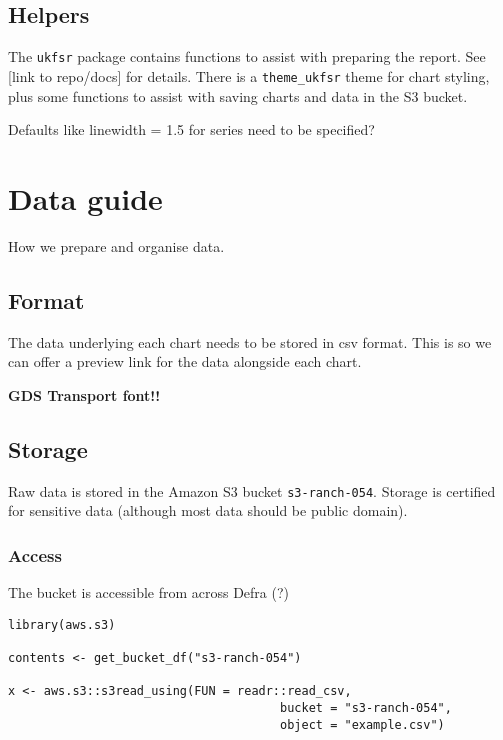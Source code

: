 \documentclass[
]{book}
\begin{document}
\hypertarget{helpers}{%
\section{Helpers}\label{helpers}}

The \texttt{ukfsr} package contains functions to assist with preparing the report. See
{[}link to repo/docs{]} for details. There is a \texttt{theme\_ukfsr} theme for chart
styling, plus some functions to assist with saving charts and data in the S3
bucket.

Defaults like linewidth = 1.5 for series need to be specified?

\hypertarget{data}{%
\chapter{Data guide}\label{data}}

How we prepare and organise data.

\hypertarget{format}{%
\section{Format}\label{format}}

The data underlying each chart needs to be stored in csv format. This is so we
can offer a preview link for the data alongside each chart.

\textbf{GDS Transport font!!}

\hypertarget{storage}{%
\section{Storage}\label{storage}}

Raw data is stored in the Amazon S3 bucket \texttt{s3-ranch-054}. Storage is certified
for sensitive data (although most data should be public domain).

\hypertarget{access}{%
\subsection{Access}\label{access}}

The bucket is accessible from across Defra (?)

\begin{verbatim}
library(aws.s3)

contents <- get_bucket_df("s3-ranch-054")

x <- aws.s3::s3read_using(FUN = readr::read_csv,
                                      bucket = "s3-ranch-054",
                                      object = "example.csv")
\end{verbatim}
\end{document}
